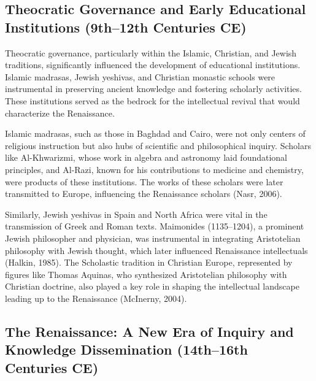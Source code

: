 \documentclass[twocolumn]{article}
\begin{document}
\subsection{Theocratic Governance and Early Educational Institutions (9th–12th Centuries CE)}

\textcolor{primary}{Theocratic governance, particularly within the Islamic, Christian, and Jewish traditions, significantly influenced the development of educational institutions. Islamic madrasas, Jewish yeshivas, and Christian monastic schools were instrumental in preserving ancient knowledge and fostering scholarly activities. These institutions served as the bedrock for the intellectual revival that would characterize the Renaissance.}

\textcolor{secondary}{Islamic madrasas, such as those in Baghdad and Cairo, were not only centers of religious instruction but also hubs of scientific and philosophical inquiry. Scholars like Al-Khwarizmi, whose work in algebra and astronomy laid foundational principles, and Al-Razi, known for his contributions to medicine and chemistry, were products of these institutions. The works of these scholars were later transmitted to Europe, influencing the Renaissance scholars (Nasr, 2006).}

\textcolor{primary}{Similarly, Jewish yeshivas in Spain and North Africa were vital in the transmission of Greek and Roman texts. Maimonides (1135–1204), a prominent Jewish philosopher and physician, was instrumental in integrating Aristotelian philosophy with Jewish thought, which later influenced Renaissance intellectuals (Halkin, 1985). The Scholastic tradition in Christian Europe, represented by figures like Thomas Aquinas, who synthesized Aristotelian philosophy with Christian doctrine, also played a key role in shaping the intellectual landscape leading up to the Renaissance (McInerny, 2004).}

\subsection{The Renaissance: A New Era of Inquiry and Knowledge Dissemination (14th–16th Centuries CE)}
\end{document}
